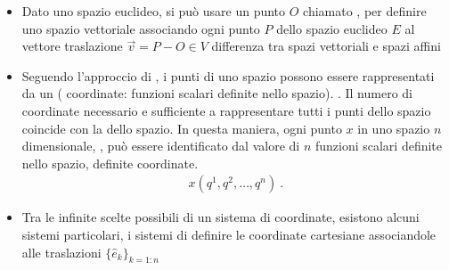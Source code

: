 \documentclass[letterpaper,10pt,italian]{jupyterBook}
\begin{document}
\begin{itemize}
\begin{enumerate}
\end{enumerate}

\item {} 
\sphinxAtStartPar
{} Dato uno spazio euclideo, si può usare un punto \(O\)  chiamato , per definire uno spazio vettoriale associando ogni punto \(P\) dello spazio euclideo \(E\) al vettore traslazione \(\vec{v} = P - O \in V\)  differenza tra spazi vettoriali e spazi affini

\item {} 
\sphinxAtStartPar
Seguendo l’approccio di , i punti di uno spazio possono essere rappresentati da un  ( coordinate: funzioni scalari definite nello spazio). . Il numero di coordinate necessario e sufficiente a rappresentare tutti i punti dello spazio coincide con la  dello spazio. In questa maniera, ogni punto \(x\) in uno spazio \(n\)\sphinxhyphen{}dimensionale, , può essere identificato dal valore di \(n\) funzioni scalari definite nello spazio, definite coordinate.
\begin{equation*}
\begin{split}x(q^1, q^2, \dots, q^n) \ .\end{split}
\end{equation*}
\item {} 
\sphinxAtStartPar
Tra le infinite scelte possibili di un sistema di coordinate, esistono alcuni sistemi particolari, i sistemi di   definire le coordinate cartesiane associandole alle traslazioni \(\{ \hat{e}_k \}_{k=1:n}\)


\end{itemize}
\end{document}

